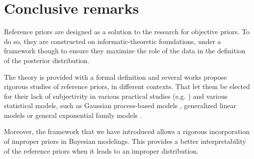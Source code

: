 \section{Conclusive remarks}\label{sec:intro-ref:conclusion}



Reference priors are designed 
as a solution to the research for objective priors.
To do so, they are constructed on informatic-theoretic foundations, under a framework though to ensure they maximize the role of the data in the definition of the posterior distribution.


The theory is provided with a formal definition and
several works propose rigorous studies of reference priors, in different contexts.
That let them be elected for their lack of subjectivity in various practical studies (e.g. \cite{chen_properties_2008,gu_parallel_2016,dandrea_objective_2021})
and various statistical models, such as Gaussian process-based models \citep{paulo_default_2005,gu_parallel_2016}, generalized linear models \citep{natarajan_reference_2000} or general exponential family models \citep{clarke_reference_2010}.

Moreover, the framework that we have introduced allows a rigorous incorporation of improper priors in Bayesian modelings.
This provides a better interpretability of the reference priors when it leads to an improper distribution. 









